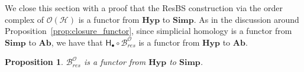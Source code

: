 \documentclass{amsart}
\newtheorem{proposition}[theorem]{Proposition}
\newcommand{\Simp}{\mathrm{\textbf{Simp}}}
\newcommand{\Ab}{\mathrm{\textbf{Ab}}}
\newcommand{\Hyp}{\mathrm{\textbf{Hyp}}}
\newcommand{\Hgroup}	     {\mathsf{H}}
\renewcommand{\hom}[2]{\Hgroup_{#2}^{#1}}
\renewcommand{\H}{\mathcal{H}}
\newcommand{\bary}{\mathcal{B}}
\newcommand{\ECP}{\mathcal{O}}
\newcommand{\cEP}[1]{{\textcolor{blue}{[Comment from Emilie: #1]}}}
\begin{document}
We close this section with a proof that the ResBS construction via the order complex of $\ECP(\H)$ is a functor from $\Hyp$ to $\Simp$.
As in the discussion around Proposition~\ref{prop:closure_functor}, since simplicial homology is a functor from $\Simp$ to $\Ab$, we have that $\hom{}{\bullet}\circ\bary_{res}^\ECP$ is a functor from $\Hyp$ to $\Ab$.


\begin{proposition}
\label{prop:bary_res_functor}
    $\bary_{res}^\ECP$ is a functor from $\Hyp$ to $\Simp$.
\end{proposition}
\end{document}
